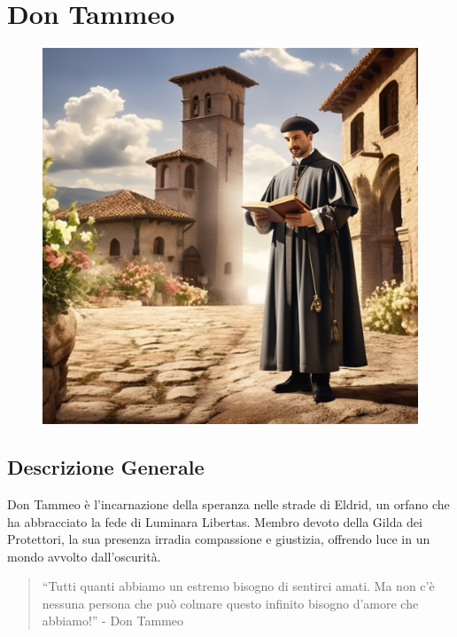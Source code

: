 \section{Don Tammeo}\label{don-tammeo}


\begin{figure}
\centering
\includegraphics{create-images-of-don-matteo-the-italian-tv-character-in-a-medieval-setting-envision-him-as-a-bene.png}
\end{figure}

\subsection{Descrizione Generale}\label{descrizione-generale}



Don Tammeo è l'incarnazione della speranza nelle strade di Eldrid, un
orfano che ha abbracciato la fede di Luminara Libertas. Membro devoto
della Gilda dei Protettori, la sua presenza irradia compassione e
giustizia, offrendo luce in un mondo avvolto dall'oscurità.

\begin{quote}
``Tutti quanti abbiamo un estremo bisogno di sentirci amati. Ma non c'è
nessuna persona che può colmare questo infinito bisogno d'amore che
abbiamo!'' - Don Tammeo
\end{quote}


